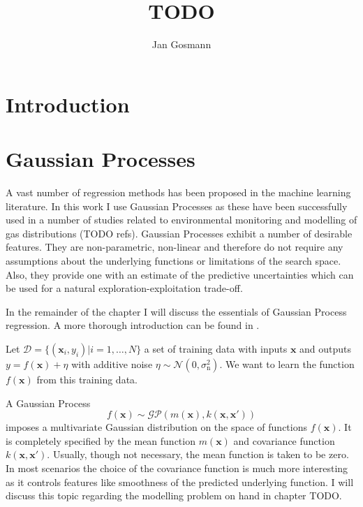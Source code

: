 \documentclass[11pt,a4paper]{scrreprt}
\title{TODO}
\author{Jan Gosmann}
\newcommand{\vc}[1]{\bm{#1}}
\begin{document}
\maketitle

\chapter{Introduction}

\chapter{Gaussian Processes}
A vast number of regression methods has been proposed in the machine learning 
literature. In this work I use Gaussian Processes as these have been 
successfully used in a number of studies related to environmental monitoring and 
modelling of gas distributions (TODO refs). Gaussian Processes exhibit a number 
of desirable features. They are non-parametric, non-linear and therefore do not 
require any assumptions about the underlying functions or limitations of the 
search space. Also, they provide one with an estimate of the predictive 
uncertainties which can be used for a natural exploration-exploitation 
trade-off.

In the remainder of the chapter I will discuss the essentials of Gaussian 
Process regression. A more thorough introduction can be found in 
\textcite{Rasmussen:2006vz}.

Let $\mathcal{D} = \{(\vc{x}_i, y_i) | i = 1, \dots, N\}$ a set of training data 
with inputs $\vc x$ and outputs $y = f(\vc x) + \eta$ with additive noise $\eta 
\sim \mathcal{N}(0, \sigma_{\text{n}}^2)$. We want to learn the function $f(\vc 
x)$ from this training data.

A Gaussian Process
\begin{equation}
    f(\vc x) \sim \mathcal{GP}(m(\vc x), k(\vc x, \vc x'))
\end{equation}
imposes a multivariate Gaussian distribution on the space of functions $f(\vc 
x)$. It is completely specified by the mean function $m(\vc x)$ and covariance 
function $k(\vc x, \vc x')$. Usually, though not necessary, the mean function is 
taken to be zero. In most scenarios the choice of the covariance function is 
much more interesting as it controls features like smoothness of the predicted 
underlying function. I will discuss this topic regarding the modelling problem 
on hand in chapter TODO.
\end{document}

